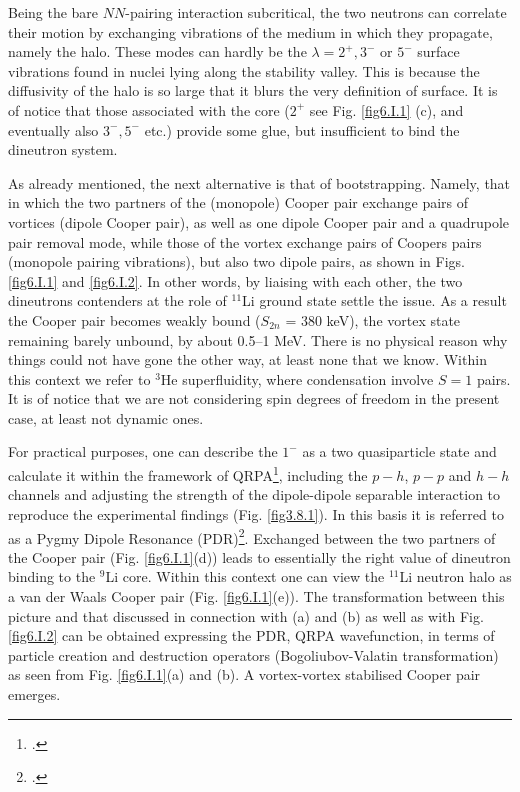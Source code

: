 \begin{subappendices}
Being the bare $NN$-pairing interaction subcritical, the two neutrons can correlate their motion by exchanging vibrations of the medium in which they propagate, namely  the halo.  These modes can hardly  be the $\lambda= 2^+,3^-$ or $5^-$ surface vibrations found in nuclei lying along the  stability valley. This is because the diffusivity of the halo is so large that it blurs the very definition of surface. It is of notice that those associated with  the core ($ 2^+$ see Fig. \ref{fig6.I.1} (c), and eventually also $3^-,5^-$ etc.) provide some glue, but insufficient to bind  the  dineutron system.

As already mentioned, the next alternative is that of bootstrapping. Namely, that in which the two partners of the  (monopole) Cooper pair exchange  pairs of vortices 
(dipole Cooper pair),  as well as one dipole Cooper pair and a quadrupole pair removal mode,
while those of the vortex exchange  pairs of Coopers pairs (monopole pairing vibrations), but also two dipole pairs, as shown in Figs. \ref{fig6.I.1} and \ref{fig6.I.2}.  In other words, by  liaising  with each other,  
the two dineutrons contenders at the role of $^{11}$Li ground state  settle the issue.  As a result  the Cooper pair becomes weakly bound ($S_{2n}$ = 380 keV), the vortex state remaining barely unbound, by about 0.5--1 MeV.
There is no physical reason why things could not have gone  the other way, at least none that we know. Within this context we refer to $^3$He superfluidity, where condensation involve $S=1$ pairs. It is of notice that we are not considering spin degrees of freedom in  the present case,
at least  not dynamic ones. 

For practical purposes, one can describe the  $1^-$ as a two quasiparticle state and calculate it within  the framework of QRPA\footnote{\cite{Broglia:19}.},  including the $p-h$, $p-p$ and $h-h$ channels and adjusting the strength of the dipole-dipole separable interaction to reproduce the  experimental findings (Fig. \ref{fig3.8.1}). In this basis it is referred to  as a Pygmy Dipole  Resonance (PDR)\footnote{\cite{Barranco:01,Broglia:19c}.}. Exchanged between the  two partners of the Cooper pair (Fig. \ref{fig6.I.1}(d)) leads to essentially the right value of  dineutron binding  to the $^9$Li core. Within this context  one can view the
$^{11}$Li neutron halo as a van der Waals Cooper pair (Fig. \ref{fig6.I.1}(e)). The transformation between this picture and  that discussed in connection with 
(a) and (b) as well as with Fig. \ref{fig6.I.2} can be obtained  expressing the PDR, QRPA wavefunction, in terms of particle  creation and destruction operators (Bogoliubov-Valatin transformation) as seen from Fig. \ref{fig6.I.1}(a) and (b). 
A vortex-vortex  stabilised Cooper pair emerges. 


\end{subappendices}
